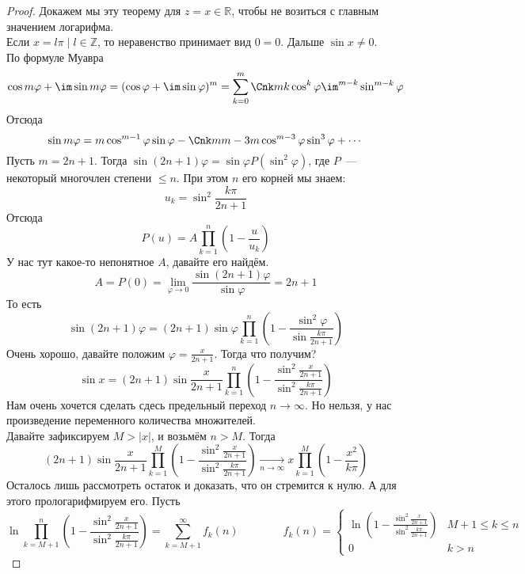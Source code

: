 \documentclass{article}
\begin{document}
    \begin{proof}
        Докажем мы эту теорему для $z=x\in\mathbb R$, чтобы не возиться с главным значением логарифма.\\
        Если $x=l\pi\mid l\in\mathbb Z$, то неравенство принимает вид $0=0$. Дальше $\sin x\neq0$.\\
        По формуле Муавра
        $$
        \cos m\varphi+\im\sin m\varphi=(\cos\varphi+\im\sin\varphi)^m=\sum\limits_{k=0}^m\Cnk mk\cos^k\varphi\im^{m-k}\sin^{m-k}\varphi
        $$
        Отсюда
        $$
        \sin m\varphi=m\cos^{m-1}\varphi\sin\varphi-\Cnk m{m-3}m\cos^{m-3}\varphi\sin^3\varphi+\cdots
        $$
        Пусть $m=2n+1$. Тогда $\sin(2n+1)\varphi=\sin\varphi P(\sin^2\varphi)$, где $P$~--- некоторый многочлен степени $\leqslant n$. При этом $n$ его корней мы знаем:
        $$
        u_k=\sin^2\frac{k\pi}{2n+1}
        $$
        Отсюда
        $$
        P(u)=A\prod\limits_{k=1}^n\left(1-\frac u{u_k}\right)
        $$
        У нас тут какое-то непонятное $A$, давайте его найдём.
        $$
        A=P(0)=\lim\limits_{\varphi\to0}\frac{\sin(2n+1)\varphi}{\sin\varphi}=2n+1
        $$
        То есть
        $$
        \sin(2n+1)\varphi=(2n+1)\sin\varphi\prod\limits_{k=1}^n\left(1-\frac{\sin^2\varphi}{\sin\frac{k\pi}{2n+1}}\right)
        $$
        Очень хорошо, давайте положим $\varphi=\frac x{2n+1}$. Тогда что получим?
        $$
        \sin x=(2n+1)\sin\frac x{2n+1}\prod\limits_{k=1}^n\left(1-\frac{\sin^2\frac x{2n+1}}{\sin^2\frac{k\pi}{2n+1}}\right)
        $$
        Нам очень хочется сделать сдесь предельный переход $n\to\infty$. Но нельзя, у нас произведение переменного количества множителей.\\
        Давайте зафиксируем $M>|x|$, и возьмём $n>M$. Тогда
        $$
        (2n+1)\sin\frac x{2n+1}\prod\limits_{k=1}^M\left(1-\frac{\sin^2\frac x{2n+1}}{\sin^2\frac{k\pi}{2n+1}}\right)\underset{n\to\infty}\longrightarrow x\prod\limits_{k=1}^M\left(1-\frac{x^2}{k\pi}\right)
        $$
        Осталось лишь рассмотреть остаток и доказать, что он стремится к нулю. А для этого прологарифмируем его. Пусть
        $$
        \ln\prod\limits_{k=M+1}^n\left(1-\frac{\sin^2\frac x{2n+1}}{\sin^2\frac{k\pi}{2n+1}}\right)=\sum\limits_{k=M+1}^\infty f_k(n)\qquad\qquad
        f_k(n)=\begin{cases}
            \ln\left(1-\frac{\sin^2\frac x{2n+1}}{\sin^2\frac{k\pi}{2n+1}}\right) & M+1\leqslant k\leqslant n\\
            0 & k>n
        \end{cases}
        $$

\end{proof}
\end{document}
